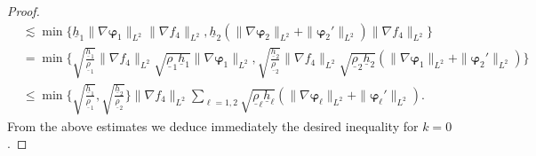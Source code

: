\documentclass[11pt,leqno]{article}
\numberwithin{equation}{section}
\numberwithin{figure}{section}
\begin{document}
\begin{proof}
\begin{align*}
&\lesssim \min\{ \underline{h}_1\|\nabla\bm{\varphi}_1\|_{L^2}\|\nabla f_4\|_{L^2}, 
 \underline{h}_2( \|\nabla\bm{\varphi}_2\|_{L^2}+\|\bm{\varphi}_2'\|_{L^2})\|\nabla f_4\|_{L^2} \} \\
&= \min\biggl\{ \sqrt{\frac{\underline{h}_1}{\underline{\rho}_1}}\|\nabla f_4\|_{L^2}
  \sqrt{\underline{\rho}_1\underline{h}_1}\|\nabla\bm{\varphi}_1\|_{L^2}, 
 \sqrt{\frac{\underline{h}_2}{\underline{\rho}_2}}\|\nabla f_4\|_{L^2}
  \sqrt{\underline{\rho}_2\underline{h}_2} (\|\nabla\bm{\varphi}_1\|_{L^2}+\|\bm{\varphi}_2'\|_{L^2}) \biggr\} \\
&\leq \min\biggl\{ \sqrt{\frac{\underline{h}_1}{\underline{\rho}_1}},
  \sqrt{\frac{\underline{h}_2}{\underline{\rho}_2}} \biggr\} \|\nabla f_4\|_{L^2}
 \sum_{\ell=1,2}\sqrt{\underline{\rho}_\ell\underline{h}_\ell}
 ( \|\nabla\bm{\varphi}_\ell\|_{L^2} + \|\bm{\varphi}_\ell'\|_{L^2} ).
\end{align*}
%
From the above estimates we deduce immediately the desired inequality for $k=0$. 



\end{proof}
\end{document}
